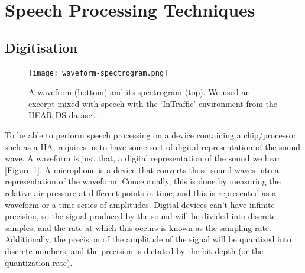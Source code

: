 \documentclass[logo,bsc,singlespacing,parskip,online]{infthesis}
\begin{document}


\newpage
\section{Speech Processing Techniques}
\subsection{Digitisation}
\begin{figure}[h]
   \centering
   \texttt{[image: waveform-spectrogram.png]}
   \caption{A wavefrom (bottom) and its spectrogram (top). 
   We used an excerpt mixed with speech with the `InTraffic'
   environment from the HEAR-DS dataset \citep{Huwel2020HearDS}.}
   \label{fig:waveform-spectrogram}
\end{figure}
To be able to perform speech processing on a device containing a chip/processor such as a HA, requires us 
to have some sort of digital representation of the sound wave. A waveform is just that, a digital representation 
of the sound we hear [Figure \ref{fig:waveform-spectrogram}]. A microphone is a device that converts those sound waves into a representation of the 
waveform. Conceptually, this is done by measuring the relative air pressure at different points in time, and 
this is represented as a waveform or a time series of amplitudes. Digital devices can't have infinite precision, so the signal produced by the sound will 
be divided into discrete samples, and the rate at which this occurs is known as the sampling rate. Additionally,
the precision of the amplitude of the signal will be quantized into discrete numbers, and the precision is 
dictated by the bit depth (or the quantization rate).
\end{document}
